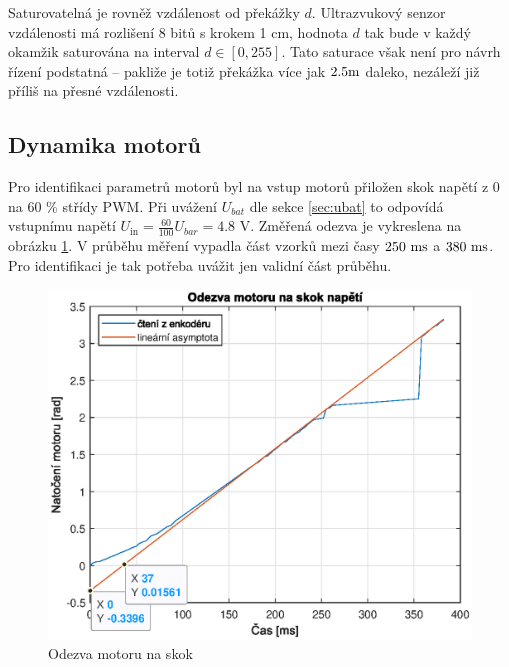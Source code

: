 \documentclass[conference]{IEEEtran}
\begin{document}
Saturovatelná je rovněž vzdálenost od překážky $d$. Ultrazvukový senzor vzdálenosti má rozlišení 8 bitů s krokem 1 \si{\centi\metre},
hodnota $d$ tak bude v každý okamžik saturována na interval $d \in \left[0, 255\right]$. Tato saturace však není pro návrh řízení podstatná --
pakliže je totiž překážka více jak $2.5 \text{\si{\metre}}$ daleko, nezáleží již příliš na přesné vzdálenosti.

\subsection{Dynamika motorů}

Pro identifikaci parametrů motorů byl na vstup motorů přiložen skok napětí z $0$ na $60$ \% střídy PWM.
Při uvážení $U_{bat}$ dle sekce \ref{sec:ubat} to odpovídá vstupnímu napětí $U_\text{in} = \frac{60}{100} U_{bar} = 4.8$ \si{\volt}.
Změřená odezva je vykreslena na obrázku \ref{fig:motor_skok}. V průběhu měření vypadla část vzorků mezi časy $250~\text{\si{\milli\second}}$ 
a $380~\text{\si{\milli\second}}$. Pro identifikaci je tak potřeba uvážit jen validní část průběhu.

\begin{figure}[htbp]
    \centerline{\includegraphics[width=\linewidth]{motor_skok.eps}}
    \caption{Odezva motoru na skok}
    \label{fig:motor_skok}        
\end{figure}
\end{document}
